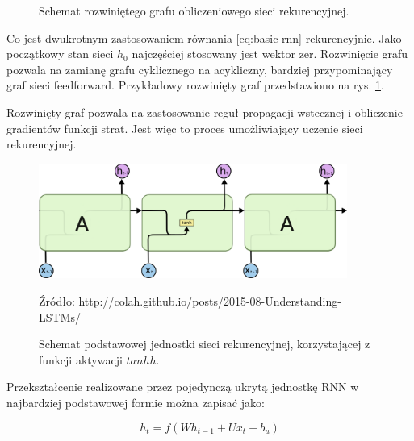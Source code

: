 \documentclass[oneside, mag]{mgr}
\begin{document}
\begin{figure}[h]
\centering
{}
\caption{Schemat rozwiniętego grafu obliczeniowego sieci rekurencyjnej.}
\label{fig:unfolded}
\end{figure}

Co jest dwukrotnym zastosowaniem równania \ref{eq:basic-rnn} rekurencyjnie. Jako początkowy stan sieci $h_0$ najczęściej stosowany jest wektor zer. Rozwinięcie grafu pozwala na zamianę grafu cyklicznego na acykliczny, bardziej przypominający graf sieci feedforward. Przykładowy rozwinięty graf przedstawiono na rys. \ref{fig:unfolded}.


Rozwinięty graf pozwala na zastosowanie reguł propagacji wstecznej i obliczenie gradientów funkcji strat. Jest więc to proces umożliwiający uczenie sieci rekurencyjnej.

\begin{figure}
\centering
	\includegraphics[width=0.9\textwidth]{img/LSTM3-SimpleRNN.png}
	\caption{Schemat podstawowej jednostki sieci rekurencyjnej, korzystającej z funkcji aktywacji $tanhh$.} Źródło: http://colah.github.io/posts/2015-08-Understanding-LSTMs/
	\label{fig:simple_rnn}
\end{figure}

Przekształcenie realizowane przez pojedynczą ukrytą jednostkę RNN w najbardziej podstawowej formie można zapisać jako:

\begin{equation}
	h_t = f(W h_{t-1} + U x_t + b_u)
\end{equation}
\end{document}
